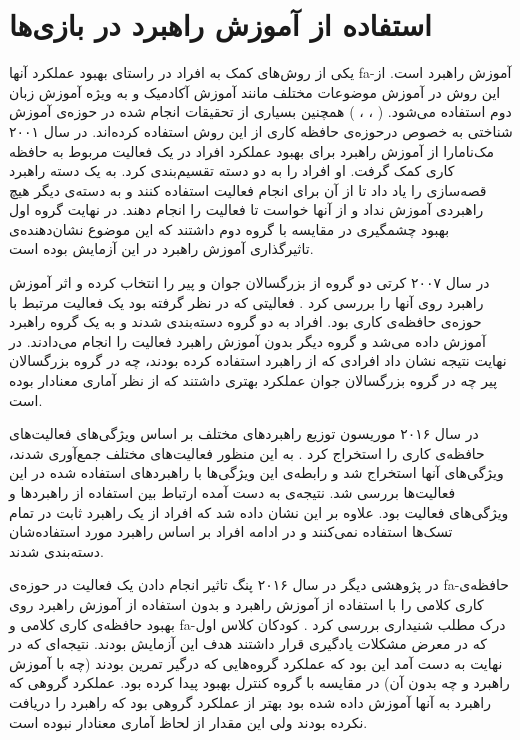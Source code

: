 \documentclass[twoside, a4paper,11pt]{book}
\numberwithin{equation}{chapter}
\numberwithin{table}{chapter}
\numberwithin{figure}{chapter}
\numberwithin{equation}{chapter}
\newcommand{\mls}[1]{\gls{fa-#1}\glsuseri{la-#1}}
\begin{document}
\section{استفاده از آموزش راهبرد در بازی‌ها}
یکی از روش‌های کمک به افراد در راستای بهبود عملکرد آنها \mls{آموزش راهبرد} است. از این روش در آموزش موضوعات مختلف مانند آموزش آکادمیک و به ویژه آموزش زبان دوم استفاده می‌شود. ( \cite{oxford1989LangStrategy}، \cite{nunan2017Lan}، \cite{donker2014Academic}) همچنین بسیاری از تحقیقات انجام شده در حوزه‌ی آموزش شناختی به خصوص درحوزه‌ی حافظه کاری از این روش استفاده کرده‌اند. در سال ۲۰۰۱ مک‌نامارا \cite{mcnamara2001MemCap} از آموزش راهبرد برای بهبود عملکرد افراد در یک فعالیت مربوط به حافظه کاری کمک گرفت. او افراد را به دو دسته تقسیم‌بندی کرد. به یک دسته راهبرد قصه‌سازی را یاد داد تا از آن برای انجام فعالیت استفاده کنند و به دسته‌ی دیگر هیچ راهبردی آموزش نداد و از آنها خواست تا فعالیت را انجام دهند. در نهایت گروه اول بهبود چشمگیری در مقایسه با گروه دوم داشتند که این موضوع نشان‌دهنده‌ی تاثیرگذاری آموزش راهبرد در این آزمایش بوده است.

در سال ۲۰۰۷ کرتی دو گروه از بزرگسالان جوان و پیر را انتخاب کرده و اثر آموزش راهبرد روی آنها را بررسی کرد \cite{carretti2007StaMem}. فعالیتی که در نظر گرفته بود یک فعالیت مرتبط با حوزه‌ی حافظه‌ی کاری بود. افراد به دو گروه دسته‌بندی شدند و به یک گروه راهبرد آموزش داده می‌شد و گروه دیگر بدون آموزش راهبرد فعالیت را انجام می‌دادند. در نهایت نتیجه نشان داد افرادی که از راهبرد استفاده کرده بودند، چه در گروه بزرگسالان پیر چه در گروه بزرگسالان جوان عملکرد بهتری داشتند که از نظر آماری معنادار بوده است.

در سال ۲۰۱۶ موریسون توزیع راهبرد‌های مختلف بر اساس ویژگی‌های فعالیت‌های حافظه‌ی کاری را استخراج کرد \cite{morrison2016variation}. به این منظور فعالیت‌های مختلف جمع‌آوری شدند، ویژگی‌های آنها استخراج شد و رابطه‌ی این ویژگی‌ها با راهبرد‌های استفاده شده در این فعالیت‌ها بررسی شد. نتیجه‌ی به دست آمده ارتباط بین استفاده از راهبرد‌ها و ویژگی‌های فعالیت بود. علاوه بر این نشان داده شد که افراد از یک راهبرد ثابت در تمام تسک‌ها استفاده نمی‌کنند و در ادامه افراد بر اساس راهبرد مورد استفاده‌شان دسته‌بندی شدند.

در پژوهشی دیگر در سال ۲۰۱۶ پنگ تاثیر انجام دادن یک فعالیت در حوزه‌ی \mls{حافظه‌ی کاری کلامی} را با استفاده از آموزش راهبرد و بدون استفاده از آموزش راهبرد روی بهبود حافظه‌ی کاری کلامی و \mls{درک مطلب شنیداری} بررسی کرد \cite{peng2016WMTrain}. کودکان کلاس اول که در معرض مشکلات یادگیری قرار داشتند هدف این آزمایش بودند. نتیجه‌ای که در نهایت به دست آمد این بود که عملکرد گروه‌هایی که درگیر تمرین بودند (چه با آموزش راهبرد و چه بدون آن) در مقایسه با گروه کنترل بهبود پیدا کرده بود. عملکرد گروهی که راهبرد به آنها آموزش داده شده بود بهتر از عملکرد گروهی بود که راهبرد را دریافت نکرده بودند ولی این مقدار از لحاظ آماری معنادار نبوده است. 
\end{document}
